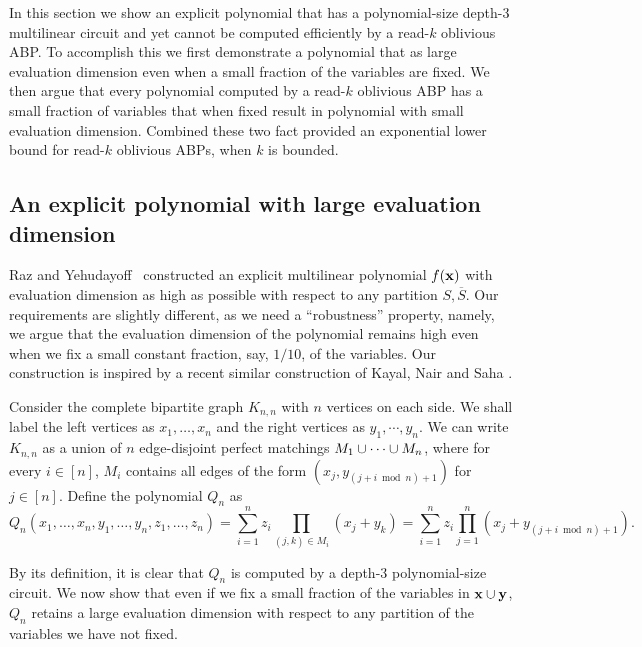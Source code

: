 \documentclass[11pt]{article}
\begin{document}
In this section we show an explicit polynomial that has a polynomial-size depth-$3$ multilinear circuit and yet cannot be computed efficiently by a read-$k$ oblivious ABP.  To accomplish this we first demonstrate a polynomial that as large evaluation dimension even when a small fraction of the variables are fixed.  We then argue that every polynomial computed by a read-$k$ oblivious ABP has a small fraction of variables that when fixed result in polynomial with small evaluation dimension.  Combined these two fact provided an exponential lower bound for read-$k$ oblivious ABPs, when $k$ is bounded.

\subsection{An explicit polynomial with large evaluation dimension}

Raz and Yehudayoff~\cite{raz-yehudayoff} constructed an explicit multilinear polynomial $f(\mathbf{x})$ with evaluation dimension as high as possible with respect to any partition $S, \overline{S}$.
Our requirements are slightly different, as we need a ``robustness'' property, namely, we argue that the evaluation dimension of the polynomial remains high even when we fix a small constant fraction, say, $1/10$, of the variables. %
Our construction is inspired by a recent similar construction of Kayal, Nair and Saha \cite{KNS15}.

Consider the complete bipartite graph $K_{n,n}$ with $n$ vertices on each side.
We shall label the left vertices as $x_1,\ldots, x_n$ and the right vertices as $y_1,\cdots, y_n$.
We can write $K_{n,n}$ as a union of $n$ edge-disjoint perfect matchings $M_1 \cup \cdots \cup M_n$, where for every $i \in [n]$, $M_i$ contains all edges of the form $(x_j, y_{(j+i \bmod n) + 1})$ for $j \in [n]$.
Define the polynomial $Q_{n}$ as
\begin{equation}\label{eqn:Qn-defn}
Q_{n}(x_1,\ldots, x_n, y_1,\ldots, y_n,z_1,\ldots, z_n) = \sum_{i=1}^n z_i \prod_{(j,k) \in M_i} (x_j + y_k)
= \sum_{i=1}^n z_i \prod_{j=1}^n (x_j + y_{(j + i \bmod n) + 1}).
\end{equation}

By its definition, it is clear that $Q_n$ is computed by a depth-$3$ polynomial-size circuit. We now show that even if we fix a small fraction of the variables in $\mathbf{x} \cup \mathbf{y}$, $Q_n$ retains a large evaluation dimension with respect to any partition of the variables we have not fixed.
\end{document}
